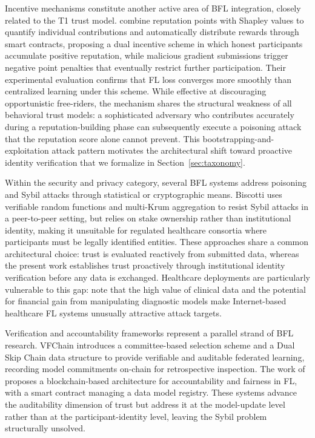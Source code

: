 \documentclass{sbc2023}
\begin{document}
Incentive mechanisms constitute another active area of BFL integration, closely related to the T1 trust model. \citet{wang2022blockchain} combine reputation points with Shapley values to quantify individual contributions and automatically distribute rewards through smart contracts, proposing a dual incentive scheme in which honest participants accumulate positive reputation, while malicious gradient submissions trigger negative point penalties that eventually restrict further participation. Their experimental evaluation confirms that FL loss converges more smoothly than centralized learning under this scheme. While effective at discouraging opportunistic free-riders, the mechanism shares the structural weakness of all behavioral trust models: a sophisticated adversary who contributes accurately during a reputation-building phase can subsequently execute a poisoning attack that the reputation score alone cannot prevent. This bootstrapping-and-exploitation attack pattern \citep{10.1007/978-981-99-7032-2_3} motivates the architectural shift toward proactive identity verification that we formalize in Section~\ref{sec:taxonomy}.

Within the security and privacy category, several BFL systems address poisoning and Sybil attacks through statistical or cryptographic means. Biscotti \citep{biscotti2021shayan} uses verifiable random functions and multi-Krum aggregation to resist Sybil attacks in a peer-to-peer setting, but relies on stake ownership rather than institutional identity, making it unsuitable for regulated healthcare consortia where participants must be legally identified entities. These approaches share a common architectural choice: trust is evaluated reactively from submitted data, whereas the present work establishes trust proactively through institutional identity verification before any data is exchanged. Healthcare deployments are particularly vulnerable to this gap: \citet{srivastava2024federated} note that the high value of clinical data and the potential for financial gain from manipulating diagnostic models make Internet-based healthcare FL systems unusually attractive attack targets.

Verification and accountability frameworks represent a parallel strand of BFL research. VFChain \citep{peng2021vfchain} introduces a committee-based selection scheme and a Dual Skip Chain data structure to provide verifiable and auditable federated learning, recording model commitments on-chain for retrospective inspection. The work of \citet{lo2022trustworthy} proposes a blockchain-based architecture for accountability and fairness in FL, with a smart contract managing a data model registry. These systems advance the auditability dimension of trust but address it at the model-update level rather than at the participant-identity level, leaving the Sybil problem structurally unsolved.
\end{document}
